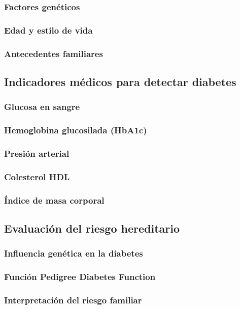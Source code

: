 \subsubsection{Factores gen\'eticos}
\subsubsection{Edad y estilo de vida}
\subsubsection{Antecedentes familiares}

\subsection{Indicadores m\'edicos para detectar diabetes}
\subsubsection{Glucosa en sangre}
\subsubsection{Hemoglobina glucosilada (HbA1c)}
\subsubsection{Presi\'on arterial}
\subsubsection{Colesterol HDL}
\subsubsection{\'Indice de masa corporal}

\subsection{Evaluaci\'on del riesgo hereditario}
\subsubsection{Influencia gen\'etica en la diabetes}
\subsubsection{Funci\'on Pedigree Diabetes Function}
\subsubsection{Interpretaci\'on del riesgo familiar}

